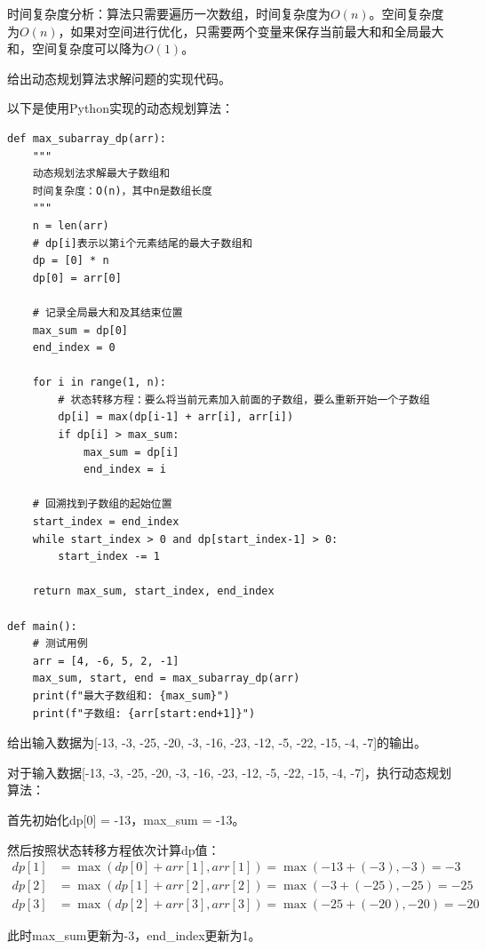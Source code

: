 \documentclass[12pt,twoside]{article}
\begin{document}
\begin{problems}
时间复杂度分析：算法只需要遍历一次数组，时间复杂度为$O(n)$。空间复杂度为$O(n)$，如果对空间进行优化，只需要两个变量来保存当前最大和和全局最大和，空间复杂度可以降为$O(1)$。

\ppart 给出动态规划算法求解问题的实现代码。

以下是使用Python实现的动态规划算法：

\begin{verbatim}
def max_subarray_dp(arr):
    """
    动态规划法求解最大子数组和
    时间复杂度：O(n)，其中n是数组长度
    """
    n = len(arr)
    # dp[i]表示以第i个元素结尾的最大子数组和
    dp = [0] * n
    dp[0] = arr[0]
    
    # 记录全局最大和及其结束位置
    max_sum = dp[0]
    end_index = 0
    
    for i in range(1, n):
        # 状态转移方程：要么将当前元素加入前面的子数组，要么重新开始一个子数组
        dp[i] = max(dp[i-1] + arr[i], arr[i])
        if dp[i] > max_sum:
            max_sum = dp[i]
            end_index = i
    
    # 回溯找到子数组的起始位置
    start_index = end_index
    while start_index > 0 and dp[start_index-1] > 0:
        start_index -= 1
    
    return max_sum, start_index, end_index

def main():
    # 测试用例
    arr = [4, -6, 5, 2, -1]
    max_sum, start, end = max_subarray_dp(arr)
    print(f"最大子数组和: {max_sum}")
    print(f"子数组: {arr[start:end+1]}")
\end{verbatim}

\ppart 给出输入数据为[-13, -3, -25, -20, -3, -16, -23, -12, -5, -22, -15, -4, -7]的输出。

对于输入数据[-13, -3, -25, -20, -3, -16, -23, -12, -5, -22, -15, -4, -7]，执行动态规划算法：

首先初始化dp[0] = -13，max\_sum = -13。

然后按照状态转移方程依次计算dp值：
\begin{align}
dp[1] &= \max(dp[0] + arr[1], arr[1]) = \max(-13 + (-3), -3) = -3 \\
dp[2] &= \max(dp[1] + arr[2], arr[2]) = \max(-3 + (-25), -25) = -25 \\
dp[3] &= \max(dp[2] + arr[3], arr[3]) = \max(-25 + (-20), -20) = -20 
\end{align}

此时max\_sum更新为-3，end\_index更新为1。


\end{problems}
\end{document}
